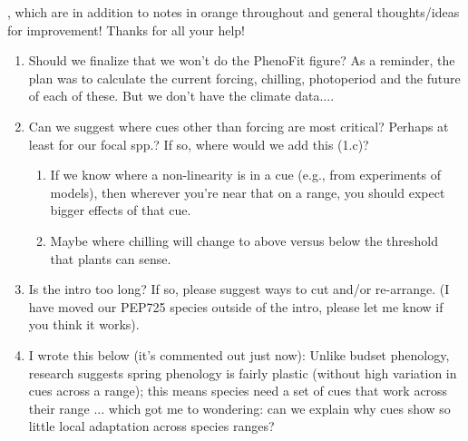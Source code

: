 \documentclass[11pt,letterpaper]{article}
\begin{document}
\newpage
{}, which are in addition to notes in orange throughout and general thoughts/ideas for improvement! Thanks for all your help!
\begin{enumerate}
\item Should we finalize that we won't do the PhenoFit figure? As a reminder, the plan was to calculate the current forcing, chilling, photoperiod and the future of each of these. But we don't have the climate data....
\item Can we suggest where cues other than forcing are most critical? Perhaps at least for our focal spp.? If so, where would we add this (1.c)?
\begin{enumerate}
\item If we know where a non-linearity is in a cue (e.g., from experiments of models), then wherever you're near that on a range, you should expect bigger effects of that cue.
\item Maybe where chilling will change to above versus below the threshold that plants can sense. 
\end{enumerate}
\item Is the intro too long? If so, please suggest ways to cut and/or re-arrange. (I have moved our PEP725 species outside of the intro, please let me know if you think it works).
\item I wrote this below (it's commented out just now): Unlike budset phenology, research suggests spring phenology is fairly plastic (without high variation in cues across a range); this means species need a set of cues that work across their range ... which got me to wondering: can we explain why cues show so little local adaptation across species ranges?
\end{enumerate}
\end{document}
